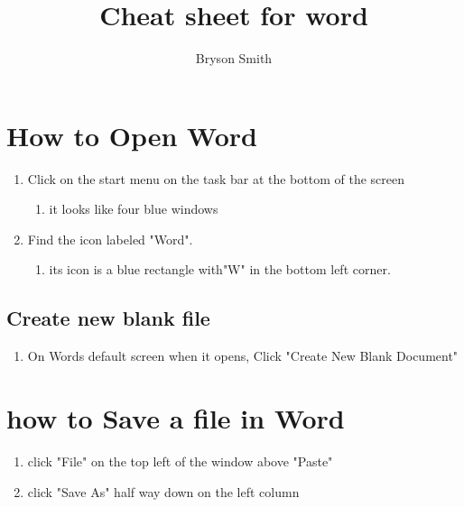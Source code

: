 \documentclass[12pt,a4paper]{article}
\title{Cheat sheet for word}
\author{Bryson Smith}
\begin{document}
\maketitle
\section{How to Open Word}

\begin{enumerate}
\item Click on the start menu on the task bar at the bottom of the screen
	\begin{enumerate}
	\item it looks like four blue windows
	\end{enumerate}
\item Find the icon labeled "Word".
	\begin{enumerate}
	\item its icon is a blue rectangle with"W" in the bottom left corner.
	\end{enumerate}
\end{enumerate}
\subsection{Create new blank file}
\begin{enumerate}
\item On Words default screen when it opens, Click "Create New Blank Document"
\end{enumerate}
\section{how to Save a file in Word}
\begin{enumerate}
\item click "File" on the top left of the window above "Paste"
\item click "Save As" half way down on the left column 
\end{enumerate}
\end{document}
